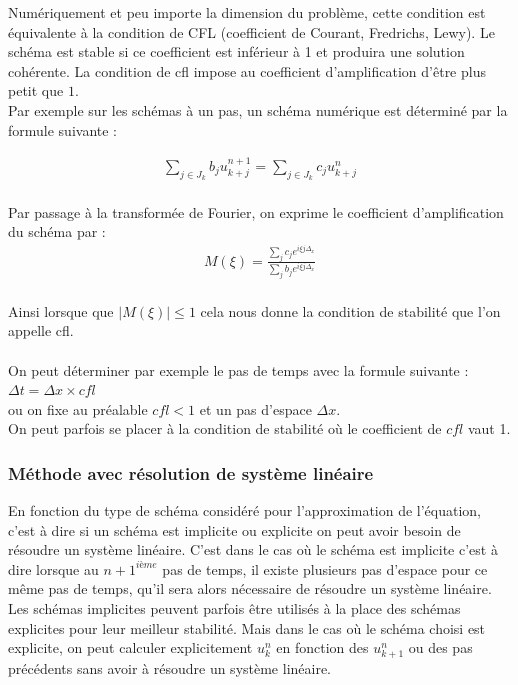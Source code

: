 \documentclass[12pt]{article}
\begin{document}
\noindent Numériquement et peu importe la dimension du problème, cette condition est équivalente à la condition de CFL (coefficient de Courant, Fredrichs, Lewy).
Le schéma est stable si ce coefficient est inférieur à 1 et produira une solution cohérente. 
La condition de cfl impose au coefficient d'amplification d'être plus petit que $1$.
\\Par exemple sur les schémas à un pas, un schéma numérique est déterminé par la formule suivante :

\begin{eqnarray}
    \sum_{j\in J_k} b_ju_{k+j}^{n+1} = \sum_{j\in J_k} c_ju_{k+j}^{n} 
\end{eqnarray}
\\Par passage à la transformée de Fourier, on exprime le coefficient d'amplification du schéma par :
\begin{eqnarray}
     M(\xi)=\frac{\sum_j c_j e^{i\xi j \Delta_x}}{\sum_j b_j e^{i \xi j\Delta_x }}
\end{eqnarray}
\\Ainsi lorsque que $|M(\xi)|\leq 1$ cela nous donne la condition de stabilité que l'on appelle cfl.
\\
\\
On peut déterminer par exemple le pas de temps avec la formule suivante :
$\Delta t = \Delta x \times cfl$
\\ou on fixe au préalable $cfl<1$ et un pas d'espace $\Delta x$.
\\On peut parfois se placer à la condition de stabilité où le coefficient de $cfl$ vaut 1.
\\
\subsubsection{Méthode avec résolution de système linéaire}
\noindent En fonction du type de schéma considéré pour l'approximation de l'équation,  c'est à dire si un schéma est implicite ou explicite on peut avoir besoin de résoudre un système linéaire. C'est dans le cas où le schéma est implicite c'est à dire lorsque au $n+1^{ième}$ pas de temps, il existe plusieurs pas d'espace pour ce même pas de temps, qu'il sera alors nécessaire de résoudre un système linéaire.
Les schémas implicites peuvent parfois être utilisés à la place des schémas explicites pour leur meilleur stabilité. 
Mais dans le cas où le schéma choisi est explicite, on peut calculer explicitement $u_k^n$ en fonction des $u_{k+1}^{n}$ ou des pas précédents sans avoir à résoudre un système linéaire.
\end{document}
